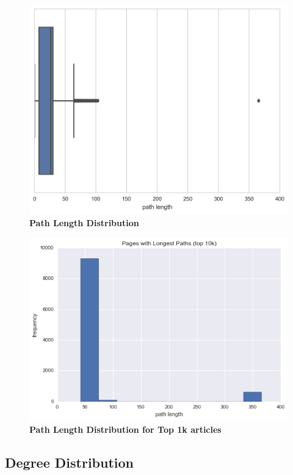 \documentclass[pre,twocolumn,twoside,superscriptaddress,floatfix, aps, 10pt]{revtex4-1}
\begin{document}
\begin{figure}[tp!]
  \centering	
  \includegraphics[width=\columnwidth]{graphics/path_lengths_boxplot.png}
  \caption{
    \textbf{Path Length Distribution}
  }
  \label{fig:Path Length Distribution}
\end{figure}

\begin{figure}[tp!]
  \centering	
  \includegraphics[width=\columnwidth]{graphics/top_1k_path_length.png}  
  \caption{
    \textbf{Path Length Distribution for Top 1k articles}
  }
  \label{fig:Top 1k Path Length Distribution}
\end{figure}


\subsection{Degree Distribution}
\end{document}
